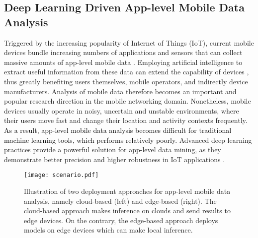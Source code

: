 \documentclass[journal,comsoc,letter]{IEEEtran}
\newcommand{\edit}[1]{\textcolor{black}{#1}}
\begin{document}
\subsection{Deep Learning Driven App-level Mobile Data Analysis}\label{sec:appdata}
Triggered by the increasing popularity of Internet of Things (IoT), current mobile devices bundle increasing numbers of applications and sensors that can collect massive amounts of app-level mobile data \cite{al2015internet}.  Employing artificial intelligence to extract useful information from these data can extend the capability of devices \cite{ota2017deep, seneviratne2017survey, li2018learning}, thus greatly benefiting users themselves, mobile operators, and indirectly device manufacturers. Analysis of mobile data therefore becomes an important and popular research direction in the mobile networking domain. Nonetheless, mobile devices usually operate in noisy, uncertain and unstable environments, where their users move fast and change their location and activity contexts frequently. \edit{As a result, app-level mobile data analysis becomes difficult for traditional machine learning tools, which performs relatively poorly.} Advanced deep learning practices provide a powerful solution for app-level data mining, as they demonstrate better precision and higher robustness in IoT applications \cite{lane2015early}.


\begin{figure*}[htb]
\begin{center}
\texttt{[image: scenario.pdf]}
\caption{\label{fig:scenario} Illustration of two deployment approaches for app-level mobile data analysis, namely cloud-based (left) and edge-based (right). The cloud-based approach makes inference on clouds and send results to edge devices. On the contrary, the edge-based approach deploys models on edge devices which can make local inference. }
\end{center}
\end{figure*}
\end{document}

